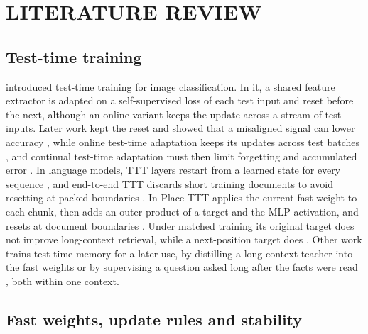 \documentclass[12pt,a4paper]{report}
\begin{document}
\chapter{LITERATURE REVIEW}

\section{Test-time training}

\citet{sun2020ttt} introduced test-time training for image classification. In it, a shared feature extractor is adapted on a self-supervised loss of each test input and reset before the next, although an online variant keeps the update across a stream of test inputs. Later work kept the reset and showed that a misaligned signal can lower accuracy \citep{gandelsman2022ttt}, while online test-time adaptation keeps its updates across test batches \citep{wang2021tent}, and continual test-time adaptation must then limit forgetting and accumulated error \citep{wang2022cotta,maharana2026continual}. In language models, TTT layers restart from a learned state for every sequence \citep{sun2025learning}, and end-to-end TTT discards short training documents to avoid resetting at packed boundaries \citep{tandon2025endtoend}. In-Place TTT applies the current fast weight to each chunk, then adds an outer product of a target and the MLP activation, and resets at document boundaries \citep{feng2026inplace}. Under matched training its original target does not improve long-context retrieval, while a next-position target does \citep{ouyang2026ttt}. Other work trains test-time memory for a later use, by distilling a long-context teacher into the fast weights \citep{wang2026learning} or by supervising a question asked long after the facts were read \citep{kim2026delayed}, both within one context.

\section{Fast weights, update rules and stability}
\end{document}
